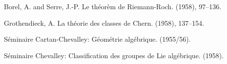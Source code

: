\documentclass{article}
\theoremstyle{plain}
\begin{document}

\nocite{*}


\begin{thebibliography}{10}

  {\sc Borel, A. and Serre, J.-P.}
  \newblock Le th\'{e}or\`{e}m de Riemann-Roch.
   (1958), 97--136.

  {\sc Grothendieck, A.}
  \newblock La th\'{e}orie des classes de Chern.
   (1958), 137--154.

  {\sc S\'{e}minaire Cartan-Chevalley:}
  \newblock G\'{e}om\'{e}trie alg\'{e}brique.
   (1955/56).

  {\sc S\'{e}minaire Chevalley:}
  \newblock Classification des groupes de Lie alg\'{e}brique.
   (1958).

\end{thebibliography}
\end{document}
